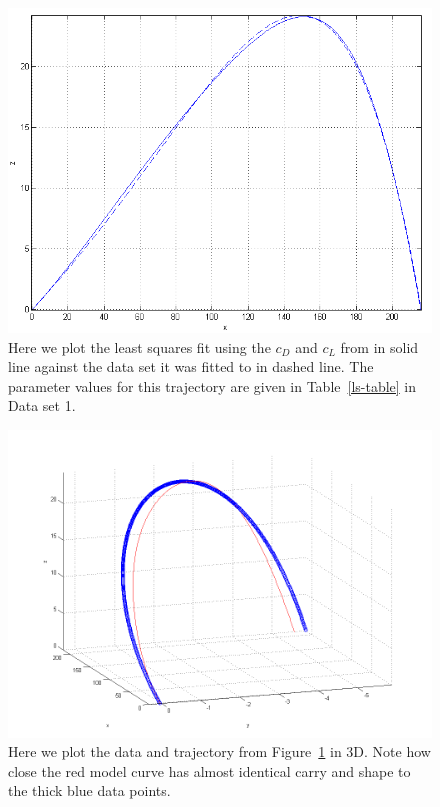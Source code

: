 \begin{figure}
\centering
\includegraphics[scale=0.7]{../images/ls-data2-1-2d.png}
\caption[Least squares using the Re and Sr form on data]{Here we plot the least squares fit using
the $c_D$ and $c_L$ from \citet{Lieberman2001} in solid line against the data set it was fitted to
in dashed line. The parameter values for this trajectory are given in Table~\ref{ls-table} in Data set 1.}
\label{ls-data2-1-2d}
\end{figure}

\begin{figure}
\centering
\includegraphics[scale=0.55]{../images/ls-data2-1-3d.png}
\caption[Least squares using the Re and Sr form on data in 3D]{Here we plot the data and trajectory from
Figure~\ref{ls-data2-1-2d} in 3D. Note how close the red model curve has almost identical carry and shape to the thick blue data points.}
\label{ls-data2-1-3d}
\end{figure}


